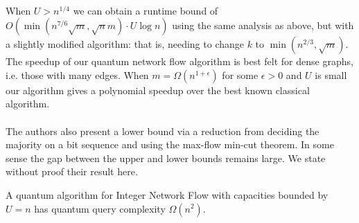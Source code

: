 \paragraph{}
When $U > n^{1/4}$ we can obtain a runtime bound of $O(\min(n^{7/6}\sqrt{m},\sqrt{n}m)\cdot U \log n)$ using the same analysis as above, but with a slightly modified algorithm: that is, needing to change $k$ to $\min(n^{2/3}, \sqrt{m})$. The speedup of our quantum network flow algorithm is best felt for dense graphs, i.e. those with many edges. When $m = \Omega(n^{1+\epsilon})$ for some $\epsilon >0$ and $U$ is small our algorithm gives a polynomial speedup over the best known classical algorithm.
\paragraph{}
The authors also present a lower bound via a reduction from deciding the majority on a bit sequence and using the max-flow min-cut theorem. In some sense the gap between the upper and lower bounds remains large. We state without proof their result here.
\begin{theorem}
\cite{ambainis2006quantum} A quantum algorithm for Integer Network Flow with capacities bounded by $U=n$ has quantum query complexity $\Omega(n^2)$.
\end{theorem}